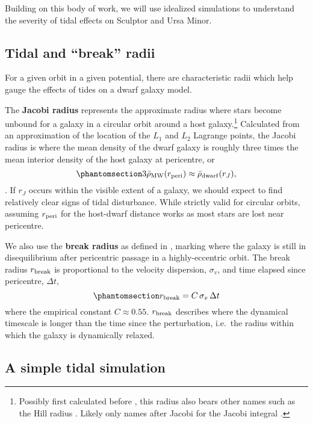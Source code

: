 Building on this body of work, we will use idealized simulations to
understand the severity of tidal effects on Sculptor and Ursa Minor.

\subsection{Tidal and ``break'' radii}\label{sec:break_radii}

For a given orbit in a given potential, there are characteristic radii
which help gauge the effects of tides on a dwarf galaxy model.

The \textbf{Jacobi radius} represents the approximate radius where stars
become unbound for a galaxy in a circular orbit around a host
galaxy.\footnote{Possibly first calculated before \citet{laplace1798},
  this radius also bears other names such as the Hill radius
  \citep[from][]{hill1878}. Likely only names after Jacobi for the
  Jacobi integral \citep{jacobi1836}.} Calculated from an approximation
of the location of the \(L_1\) and \(L_2\) Lagrange points, the Jacobi
radius is where the mean density of the dwarf galaxy is roughly three
times the mean interior density of the host galaxy at pericentre, or
\begin{equation}\protect\phantomsection\label{eq:r_jacobi}{
3\bar \rho_{\rm MW}(r_{\rm peri}) \approx \bar \rho_{\rm dwarf}(r_J),
}\end{equation} \citep[ eq. 7-84]{BT1987}. If \(r_J\) occurs within the
visible extent of a galaxy, we should expect to find relatively clear
signs of tidal disturbance. While strictly valid for circular orbits,
assuming \(r_{\rm peri}\) for the host-dwarf distance works as most
stars are lost near pericentre.

We also use the \textbf{break radius} as defined in
\citet{penarrubia+2009}, marking where the galaxy is still in
disequilibrium after pericentric passage in a highly-eccentric orbit.
The break radius \(r_{\rm break}\) is proportional to the velocity
dispersion, \(\sigma_v\), and time elapsed since pericentre,
\(\Delta t\), \begin{equation}\protect\phantomsection\label{eq:r_break}{
r_{\rm break} = C\,\sigma_{v}\,\Delta t
}\end{equation} where the empirical constant \(C \approx 0.55\).
\(r_{\rm break}\) describes where the dynamical timescale is longer than
the time since the perturbation, i.e.~the radius within which the galaxy
is dynamically relaxed.

\subsection{A simple tidal simulation}\label{a-simple-tidal-simulation}

